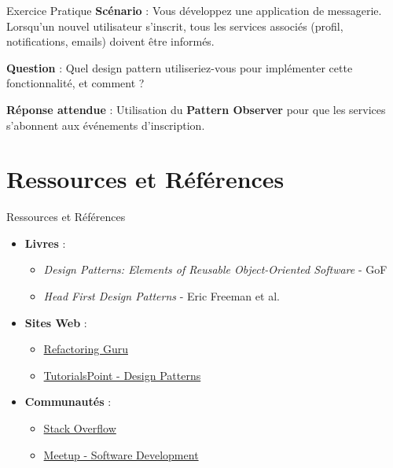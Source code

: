 \documentclass[aspectratio=169]{beamer}
\begin{document}
\begin{frame}{Exercice Pratique}
    \textbf{Scénario} : Vous développez une application de messagerie. Lorsqu'un nouvel utilisateur s'inscrit, tous les services associés (profil, notifications, emails) doivent être informés.

    \vspace{0.5cm}

    \textbf{Question} : Quel design pattern utiliseriez-vous pour implémenter cette fonctionnalité, et comment ?

    \vspace{0.5cm}

    \pause

    \textbf{Réponse attendue} : Utilisation du \textbf{Pattern Observer} pour que les services s'abonnent aux événements d'inscription.
\end{frame}

\section{Ressources et Références}

\begin{frame}{Ressources et Références}
    \begin{itemize}
        \item \textbf{Livres} :
              \begin{itemize}
                  \item \textit{Design Patterns: Elements of Reusable Object-Oriented Software} - GoF
                  \item \textit{Head First Design Patterns} - Eric Freeman et al.
              \end{itemize}
        \item \textbf{Sites Web} :
              \begin{itemize}
                  \item \href{https://refactoring.guru/design-patterns}{Refactoring Guru}
                  \item \href{https://www.tutorialspoint.com/design_pattern/index.htm}{TutorialsPoint - Design Patterns}
              \end{itemize}
        \item \textbf{Communautés} :
              \begin{itemize}
                  \item \href{https://stackoverflow.com}{Stack Overflow}
                  \item \href{https://www.meetup.com/topics/softwaredev/}{Meetup - Software Development}
              \end{itemize}
    \end{itemize}
\end{frame}
\end{document}
